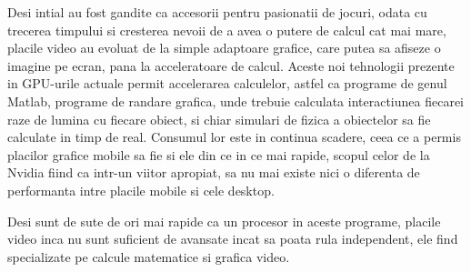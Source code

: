Desi intial au fost gandite ca accesorii pentru pasionatii de jocuri, odata cu trecerea timpului si
cresterea nevoii de a avea o putere de calcul cat mai mare, placile video au evoluat  de la simple
adaptoare grafice, care putea sa afiseze o imagine pe ecran, pana la acceleratoare de calcul.
Aceste noi tehnologii prezente in GPU-urile actuale permit accelerarea calculelor, astfel ca
programe de genul Matlab, programe de randare grafica, unde trebuie calculata interactiunea
fiecarei raze de lumina cu fiecare obiect, si chiar simulari de fizica a obiectelor sa fie
calculate in timp de real. Consumul lor este in continua scadere, ceea ce a permis placilor grafice
mobile sa fie si ele din ce in ce mai rapide, scopul celor de la Nvidia fiind ca intr-un viitor
apropiat, sa nu mai existe nici o diferenta de performanta intre placile mobile si cele desktop. 

Desi sunt de sute de ori mai rapide ca un procesor in aceste programe,
placile video inca nu sunt suficient de avansate incat sa poata rula independent, ele find
specializate pe calcule matematice si grafica video.



